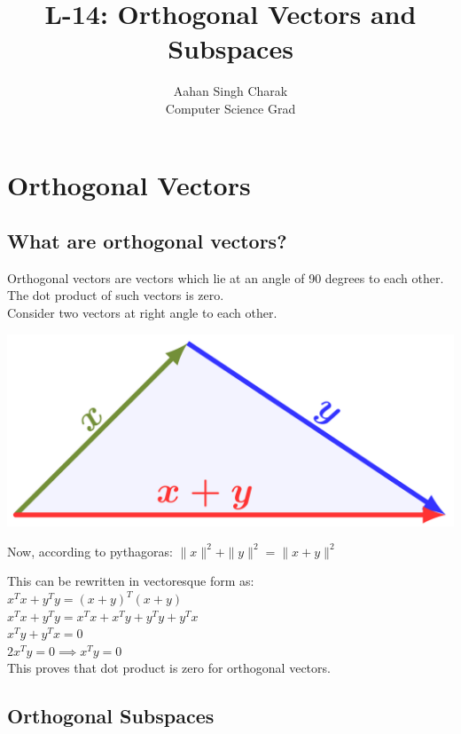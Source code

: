 \documentclass[]{article}
\title{L-14: Orthogonal Vectors and Subspaces}
\author{Aahan Singh Charak\\Computer Science Grad}
\begin{document}
\maketitle

\section{Orthogonal Vectors}
\vspace{10pt}
\subsection{What are orthogonal vectors?}
Orthogonal vectors are vectors which lie at an angle of 90 degrees to each other. The dot product of such vectors is zero.\\

Consider two vectors at right angle to each other.
\vspace{12pt}
\begin{center}
\includegraphics[scale=.25]{triangle}
\end{center}
\vspace{10pt}
Now, according to pythagoras:
\vspace{5pt}
$\|x\|^2 + \|y\|^2 = \|x+y\|^2$

This can be rewritten in vectoresque form as:\\

$x^Tx+y^Ty=(x+y)^T(x+y)$\\

$x^Tx+y^Ty=x^Tx+x^Ty+y^Ty+y^Tx$\\

$x^Ty+y^Tx=0$\\

$2x^Ty=0 \implies x^Ty=0$\\

This proves that dot product is zero for orthogonal vectors.

\subsection{Orthogonal Subspaces}
\end{document}
